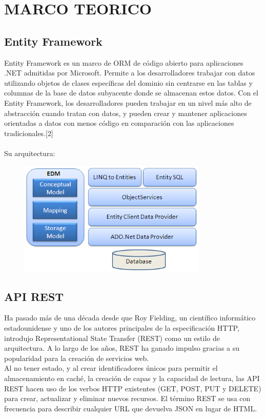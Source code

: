 \section{MARCO TEORICO} 

\par 


\subsection{Entity Framework}
	\par Entity Framework es un marco de ORM de código abierto para aplicaciones .NET admitidas por Microsoft. Permite a los desarrolladores trabajar con datos utilizando objetos de clases específicas del dominio sin centrarse en las tablas y columnas de la base de datos subyacente donde se almacenan estos datos. Con el Entity Framework, los desarrolladores pueden trabajar en un nivel más alto de abstracción cuando tratan con datos, y pueden crear y mantener aplicaciones orientadas a datos con menos código en comparación con las aplicaciones tradicionales.[2]\\
\\Su arquitectura:
\begin{figure}[H]
\begin{center}
\includegraphics[width=9cm]{./Imagenes/ef-architecture}
\end{center}
\end{figure}

\subsection{API REST}
	\par Ha pasado más de una década desde que Roy Fielding, un científico informático estadounidense y uno de los autores principales de la especificación HTTP, introdujo Representational State Transfer (REST) como un estilo de arquitectura. A lo largo de los años, REST ha ganado impulso gracias a su popularidad para la creación de servicios web.\\
Al no tener estado, y al crear identificadores únicos para permitir el almacenamiento en caché, la creación de capas y la capacidad de lectura, las API REST hacen uso de los verbos HTTP existentes (GET, POST, PUT y DELETE) para crear, actualizar y eliminar nuevos recursos. El término REST se usa con frecuencia para describir cualquier URL que devuelva JSON en lugar de HTML.

